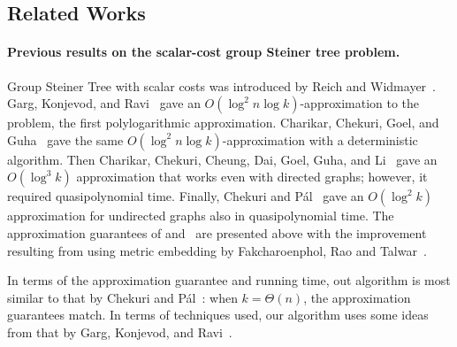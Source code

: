\documentclass[11pt,a4paper]{article}
\begin{document}
\subsection{Related Works}

\paragraph{Previous results on the scalar-cost group Steiner tree problem.}
Group Steiner Tree with scalar costs was introduced by Reich and Widmayer~\cite{reich1989beyond}. Garg, Konjevod, and Ravi~\cite{garg2000polylogarithmic} gave an $O(\log^2 n  \log k)$-approximation to the problem, the first polylogarithmic approximation. Charikar, Chekuri, Goel, and Guha~\cite{charikar1998rounding} gave the same $O(\log^2 n \log k)$-approximation with a deterministic algorithm.
Then Charikar, Chekuri, Cheung, Dai, Goel, Guha, and Li~\cite{charikar1999approximation} gave an \(O(\log^3 k )\) approximation that works even with directed graphs; however, it required quasipolynomial time. Finally, Chekuri and P\'al~\cite{chekuri2005recursive} gave an \(O(\log^2 k )\) approximation for undirected graphs also in quasipolynomial time. The approximation guarantees of \cite{garg2000polylogarithmic} and~\cite{charikar1998rounding} are presented above with the improvement resulting from using metric embedding by Fakcharoenphol, Rao and Talwar~\cite{fakcharoenphol2003tight}. 

In terms of the approximation guarantee and running time, out algorithm is most similar to that by Chekuri and P\'al~\cite{chekuri2005recursive}: when $k = \Theta(n)$, the approximation guarantees match. In terms of techniques used, our algorithm uses some ideas from that by Garg, Konjevod, and Ravi~\cite{garg2000polylogarithmic}.
\end{document}
